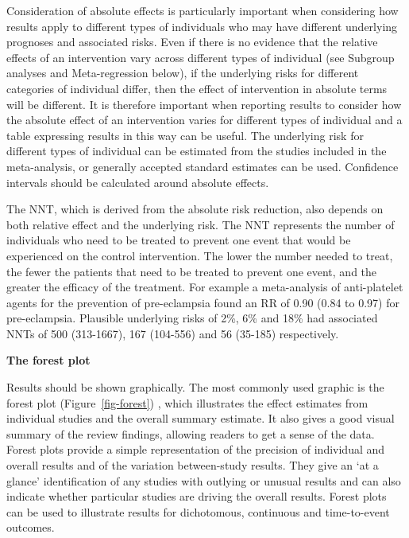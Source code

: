 \documentclass[
  10pt,
  a4paper,
  DIV=11,
  numbers=noendperiod]{scrreprt}
\begin{document}
Consideration of absolute effects is particularly important when
considering how results apply to different types of individuals who may
have different underlying prognoses and associated risks. Even if there
is no evidence that the relative effects of an intervention vary across
different types of individual (see Subgroup analyses and Meta-regression
below), if the underlying risks for different categories of individual
differ, then the effect of intervention in absolute terms will be
different. It is therefore important when reporting results to consider
how the absolute effect of an intervention varies for different types of
individual and a table expressing results in this way can be useful. The
underlying risk for different types of individual can be estimated from
the studies included in the meta-analysis, or generally accepted
standard estimates can be used. Confidence intervals should be
calculated around absolute effects.

The NNT, which is derived from the absolute risk reduction, also depends
on both relative effect and the underlying risk. The NNT represents the
number of individuals who need to be treated to prevent one event that
would be experienced on the control intervention. The lower the number
needed to treat, the fewer the patients that need to be treated to
prevent one event, and the greater the efficacy of the treatment. For
example a meta-analysis of anti-platelet agents for the prevention of
pre-eclampsia found an RR of 0.90 (0.84 to 0.97) for pre-eclampsia.
Plausible underlying risks of 2\%, 6\% and 18\% had associated NNTs of
500 (313-1667), 167 (104-556) and 56 (35-185) respectively.

\textbf{The forest plot}

Results should be shown graphically. The most commonly used graphic is
the forest plot (Figure~\ref{fig-forest}) , which illustrates the effect
estimates from individual studies and the overall summary estimate. It
also gives a good visual summary of the review findings, allowing
readers to get a sense of the data. Forest plots provide a simple
representation of the precision of individual and overall results and of
the variation between-study results. They give an `at a glance'
identification of any studies with outlying or unusual results and can
also indicate whether particular studies are driving the overall
results. Forest plots can be used to illustrate results for dichotomous,
continuous and time-to-event outcomes.
\end{document}
